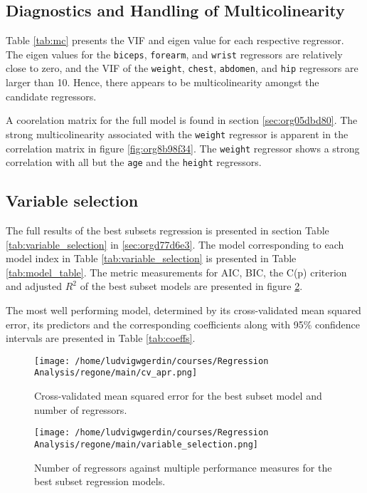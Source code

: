 \documentclass[11pt]{article}
\begin{document}


\subsection{Diagnostics and Handling of Multicolinearity}
\label{sec:orgf60dc82}

Table \ref{tab:mc} presents the VIF and eigen value for each respective regressor. The eigen values for the 
\texttt{biceps}, \texttt{forearm}, and \texttt{wrist} regressors are relatively close to zero, and the
VIF of the \texttt{weight}, \texttt{chest}, \texttt{abdomen}, and \texttt{hip} regressors are larger than 10.
Hence, there appears to be multicolinearity amongst the candidate regressors.

A coorelation matrix for the full model is found in section \ref{sec:org05dbd80}. The strong multicolinearity
associated with the \texttt{weight} regressor is apparent in the correlation matrix in figure
\ref{fig:org8b98f34}. The \texttt{weight} regressor shows a strong correlation with all but the \texttt{age} and
the \texttt{height} regressors.

 

\subsection{Variable selection}
\label{sec:org58dc690}

The full results of the best subsets regression is presented in section Table \ref{tab:variable_selection}
in \ref{sec:orgd77d6e3}. The model corresponding to each model index in Table \ref{tab:variable_selection} is presented in
Table \ref{tab:model_table}. The metric measurements for AIC, BIC, the C(p) criterion and adjusted \(R^2\) 
of the best subset models are presented in figure \ref{fig:org0071367}. 

The most well performing model, determined by its cross-validated mean squared error, its predictors and
the corresponding coefficients along with 95\% confidence intervals are presented in Table \ref{tab:coeffs}.

\begin{figure}[htbp]
\centering
\texttt{[image: /home/ludvigwgerdin/courses/Regression Analysis/regone/main/cv\_apr.png]}
\caption{\label{fig:org1eedb5a}
Cross-validated mean squared error for the best subset model and number of regressors.}
\end{figure}

\begin{figure}[htbp]
\centering
\texttt{[image: /home/ludvigwgerdin/courses/Regression Analysis/regone/main/variable\_selection.png]}
\caption{\label{fig:org0071367}
Number of regressors against multiple performance measures for the best subset regression models.}
\end{figure}
\end{document}
